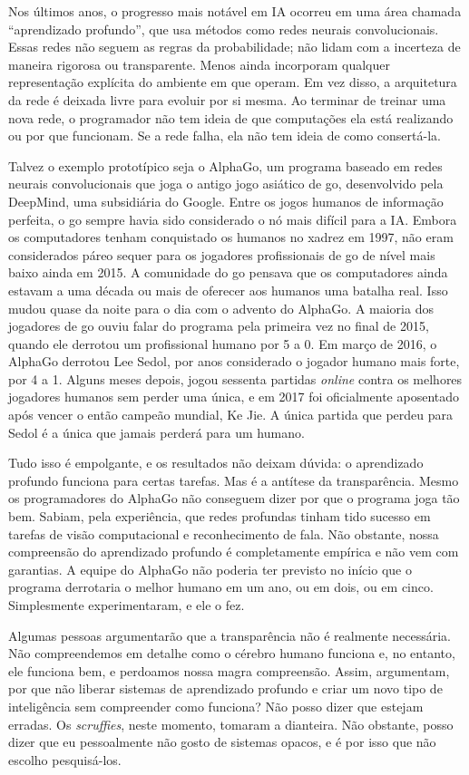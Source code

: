 \documentclass[11pt,a5paper,twoside]{book}
\begin{document}
Nos últimos anos, o progresso mais notável em IA ocorreu em uma área chamada “aprendizado profundo”, que usa métodos como redes neurais convolucionais. Essas redes não seguem as regras da probabilidade; não lidam com a incerteza de maneira rigorosa ou transparente. Menos ainda incorporam qualquer representação explícita do ambiente em que operam. Em vez disso, a arquitetura da rede é deixada livre para evoluir por si mesma. Ao terminar de treinar uma nova rede, o programador não tem ideia de que computações ela está realizando ou por que funcionam. Se a rede falha, ela não tem ideia de como consertá-la.

Talvez o exemplo prototípico seja o AlphaGo, um programa baseado em redes neurais convolucionais que joga o antigo jogo asiático de go, desenvolvido pela DeepMind, uma subsidiária do Google. Entre os jogos humanos de informação perfeita, o go sempre havia sido considerado o nó mais difícil para a IA. Embora os computadores tenham conquistado os humanos no xadrez em 1997, não eram considerados páreo sequer para os jogadores profissionais de go de nível mais baixo ainda em 2015. A comunidade do go pensava que os computadores ainda estavam a uma década ou mais de oferecer aos humanos uma batalha real. Isso mudou quase da noite para o dia com o advento do AlphaGo. A maioria dos jogadores de go ouviu falar do programa pela primeira vez no final de 2015, quando ele derrotou um profissional humano por 5 a 0. Em março de 2016, o AlphaGo derrotou Lee Sedol, por anos considerado o jogador humano mais forte, por 4 a 1. Alguns meses depois, jogou sessenta partidas \textit{online} contra os melhores jogadores humanos sem perder uma única, e em 2017 foi oficialmente aposentado após vencer o então campeão mundial, Ke Jie. A única partida que perdeu para Sedol é a única que jamais perderá para um humano.

Tudo isso é empolgante, e os resultados não deixam dúvida: o aprendizado profundo funciona para certas tarefas. Mas é a antítese da transparência. Mesmo os programadores do AlphaGo não conseguem dizer por que o programa joga tão bem. Sabiam, pela experiência, que redes profundas tinham tido sucesso em tarefas de visão computacional e reconhecimento de fala. Não obstante, nossa compreensão do aprendizado profundo é completamente empírica e não vem com garantias. A equipe do AlphaGo não poderia ter previsto no início que o programa derrotaria o melhor humano em um ano, ou em dois, ou em cinco. Simplesmente experimentaram, e ele o fez.

Algumas pessoas argumentarão que a transparência não é realmente necessária. Não compreendemos em detalhe como o cérebro humano funciona e, no entanto, ele funciona bem, e perdoamos nossa magra compreensão. Assim, argumentam, por que não liberar sistemas de aprendizado profundo e criar um novo tipo de inteligência sem compreender como funciona? Não posso dizer que estejam erradas. Os \textit{scruffies}, neste momento, tomaram a dianteira. Não obstante, posso dizer que eu pessoalmente não gosto de sistemas opacos, e é por isso que não escolho pesquisá-los.
\end{document}
